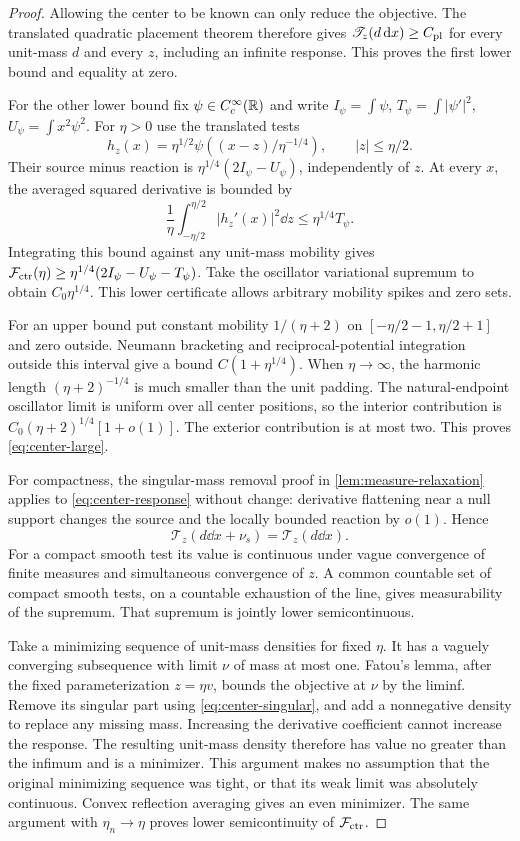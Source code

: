\begin{proof}
Allowing the center to be known can only reduce the objective.
The translated quadratic placement theorem therefore gives
$\mathscr T_z(d\,\mathrm d x)\ge C_{\rm pl}$ for every unit-mass $d$
and every $z$, including an infinite response. This proves the
first lower bound and equality at zero.

For the other lower bound fix $\psi\in C_c^\infty(\mathbb R)$ and write
$I_\psi=\int\psi$, $T_\psi=\int|\psi'|^2$,
$U_\psi=\int x^2\psi^2$. For $\eta>0$ use the translated tests
\[
 h_z(x)=\eta^{1/2}\psi((x-z)/\eta^{-1/4}),
                       \qquad |z|\le\eta/2.
\]
Their source minus reaction is
$\eta^{1/4}(2I_\psi-U_\psi)$, independently of $z$.
At every $x$, the averaged squared derivative is bounded by
\[
 \frac1\eta\int_{-\eta/2}^{\eta/2}|h_z'(x)|^2\dd z
       \le\eta^{1/4}T_\psi.
\]
Integrating this bound against any unit-mass mobility gives
$\mathcal F_{\rm ctr}(\eta)\ge
\eta^{1/4}(2I_\psi-U_\psi-T_\psi)$. Take the oscillator
variational supremum to obtain $C_0\eta^{1/4}$. This lower
certificate allows arbitrary mobility spikes and zero sets.

For an upper bound put constant mobility $1/(\eta+2)$ on
$[-\eta/2-1,\eta/2+1]$ and zero outside. Neumann bracketing
and reciprocal-potential integration outside this interval give
a bound $C(1+\eta^{1/4})$. When $\eta\to\infty$, the harmonic
length $(\eta+2)^{-1/4}$ is much smaller than the unit padding.
The natural-endpoint oscillator limit is uniform over all center
positions, so the interior contribution is
$C_0(\eta+2)^{1/4}[1+o(1)]$. The exterior contribution is at
most two. This proves \eqref{eq:center-large}.

For compactness, the singular-mass removal proof in
\cref{lem:measure-relaxation} applies to \eqref{eq:center-response}
without change: derivative flattening near a null support changes
the source and the locally bounded reaction by $o(1)$. Hence
\begin{equation}\label{eq:center-singular}
      \mathscr T_z(d\dd x+\nu_s)=\mathscr T_z(d\dd x).
\end{equation}
For a compact smooth test its value is continuous under vague
convergence of finite measures and simultaneous convergence of
$z$. A common countable set of compact smooth tests, on a
countable exhaustion of the line, gives measurability of the
supremum. That supremum is jointly lower semicontinuous.

Take a minimizing sequence of unit-mass densities for fixed
$\eta$. It has a vaguely converging subsequence with limit $\nu$
of mass at most one. Fatou's lemma, after the fixed parameterization
$z=\eta v$, bounds the objective at $\nu$ by the liminf. Remove
its singular part using \eqref{eq:center-singular}, and add a
nonnegative density to replace any missing mass. Increasing the
derivative coefficient cannot increase the response. The resulting
unit-mass density therefore has value no greater than the infimum
and is a minimizer. This argument makes no assumption that the
original minimizing sequence was tight, or that its weak limit
was absolutely continuous. Convex reflection averaging gives an
even minimizer. The same argument with $\eta_n\to\eta$ proves
lower semicontinuity of $\mathcal F_{\rm ctr}$.


\end{proof}
